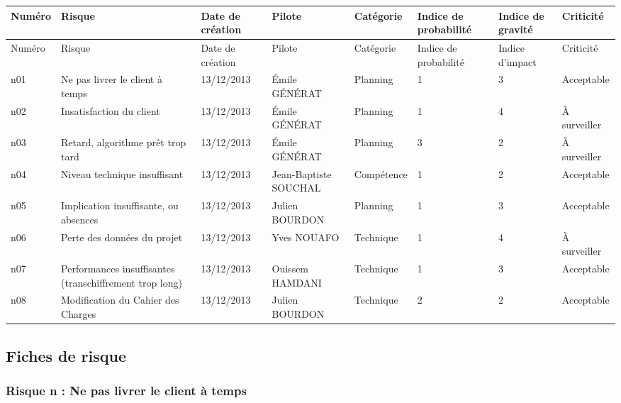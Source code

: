 \documentclass[a4paper,11pt,french]{article}
\begin{document}
\begin{landscape}

\begin{longtable}{|m{1.5cm}|m{4cm}|m{3cm}|m{3.2cm}|m{2.2cm}|m{2cm}|m{2cm}|m{2.2cm}|}
\hline
\rowcolor[gray]{.8}
Numéro & Risque & Date de création & Pilote & Catégorie \footnotemark[1] & Indice de probabilité & Indice de gravité & Criticité \footnotemark[2] \\ 
\hline
\endfirsthead
\hline
\rowcolor[gray]{.8}
Numéro & Risque & Date de création & Pilote & Catégorie \footnotemark[1] & Indice de probabilité & Indice d'impact & Criticité \footnotemark[2] \\ 
\hline

\endhead
n01 & Ne pas livrer le client à temps & 13/12/2013 & Émile GÉNÉRAT & Planning & 1 & 3 & Acceptable \\
\hline
n02 & Insatisfaction du client & 13/12/2013 & Émile GÉNÉRAT & Planning & 1 & 4 &  À surveiller \\
\hline
n03 & Retard, algorithme prêt trop tard & 13/12/2013 & Émile GÉNÉRAT & Planning & 3 & 2 & À surveiller \\
\hline
n04 & Niveau technique insuffisant & 13/12/2013 & Jean-Baptiste SOUCHAL &  Compétence & 1 & 2 & Acceptable \\
\hline
n05 & Implication insuffisante, ou absences & 13/12/2013 & Julien BOURDON & Planning & 1 & 3 & Acceptable \\
\hline
n06 & Perte des données du projet & 13/12/2013 & Yves NOUAFO & Technique & 1 & 4 & À surveiller \\
\hline
n07 & Performances insuffisantes (transchiffrement trop long) & 13/12/2013 & Ouissem HAMDANI & Technique & 1 & 3 & Acceptable \\
\hline
n08 & Modification du Cahier des Charges & 13/12/2013 & Julien BOURDON & Technique & 2 & 2 & Acceptable \\
\hline

\end{longtable}

\end{landscape}

\newpage

\subsection{Fiches de risque}

\subsubsection{Risque n  : Ne pas livrer le client à temps}

\end{document}
